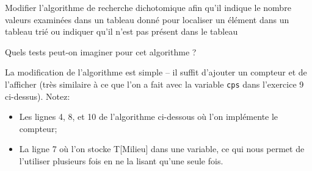 \documentclass[12pt]{article}
\begin{document}
	\begin{MonExo}
		\begin{alphenum}
			\item  Modifier l'algorithme de recherche dichotomique afin qu'il indique le nombre valeurs examinées dans un tableau donné pour localiser un élément dans un tableau trié ou indiquer qu'il n’est pas présent dans le tableau
			\item Quels tests peut-on imaginer pour cet algorithme ?
		\end{alphenum}
	\end{MonExo}
	\begin{MaReponse}
		\begin{alphenum}
			\item La modification de l'algorithme est simple -- il suffit d'ajouter un compteur et de l'afficher (très similaire à ce que l'on a fait avec la variable \texttt{cps} dans l'exercice 9 ci-dessus). Notez:
			\begin{itemize}
				\item Les lignes 4, 8, et 10 de l'algorithme ci-dessous où l'on implémente le compteur;
				\item La ligne 7 où l'on stocke T[Milieu] dans une variable, ce qui nous permet de l'utiliser plusieurs fois en ne la lisant qu'une seule fois.
			\end{itemize} 
			

\end{alphenum}
\end{MaReponse}
\end{document}
